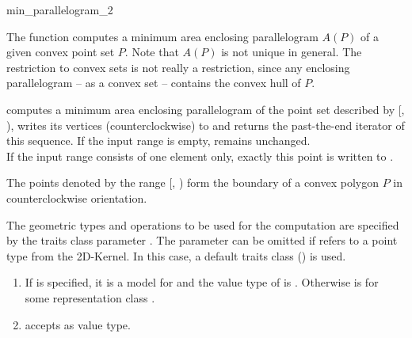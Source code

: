 \begin{ccRefFunction}{min_parallelogram_2}
  
  \ccDefinition The function computes a minimum area enclosing
  parallelogram $A(P)$ of a given convex point set $P$.  Note that
  $A(P)$ is not unique in general.  The restriction to convex sets is
  not really a restriction, since any enclosing parallelogram -- as a
  convex set -- contains the convex hull of $P$.


  \def\ccLongParamLayout{\ccTrue} 
  
  
  computes a minimum area enclosing parallelogram of the point set
  described by [, ), writes its
  vertices (counterclockwise) to  and returns the past-the-end
  iterator of this sequence.
  If the input range is empty,  remains unchanged.\\
  If the input range consists of one element only,
  exactly this point is written to .
  
  \ccPrecond The points denoted by the range [,
  ) form the boundary of a convex polygon $P$ in
  counterclockwise orientation.

  The geometric types and operations to be used for the computation
  are specified by the traits class parameter . The parameter
  can be omitted if  refers to a point type from
  the 2D-Kernel. In this case, a default traits class
  () is used.
  
  \ccRequire
  \begin{enumerate}
  \item If  is specified, it is a model for
     and the value type  of
     is .  Otherwise
     is  for some representation class
    .
  \item {} accepts  as value type.
  \end{enumerate}
  

\end{ccRefFunction}
